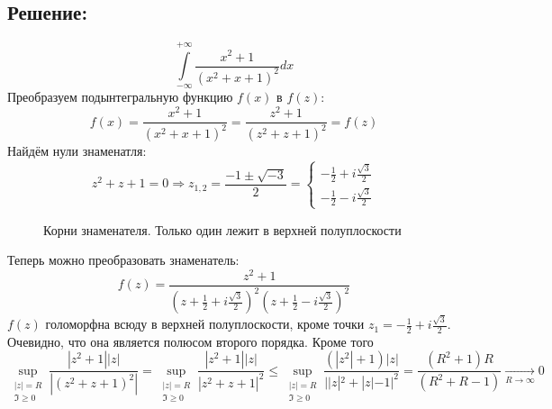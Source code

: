\documentclass{article}
\begin{document}
	\subsection{Решение:}
	\[\int\limits_{-\infty}^{+\infty} \frac{x^2+1}{\left(x^2 + x + 1\right)^2}dx\]
	Преобразуем подынтегральную функцию $f(x)$ в $f(z)$:
	\[f(x) = \frac{x^2+1}{\left(x^2 + x + 1\right)^2}  = \frac{z^2+1}{\left(z^2 + z + 1\right)^2} = f(z)\]
	Найдём нули знаменатля:
	\[z^2 + z + 1 = 0 \Rightarrow z_{1,2} = \frac{-1 \pm \sqrt{-3}}{2} = \begin{cases}
		-\frac{1}{2} + i \frac{\sqrt{3}}{2}\\
		-\frac{1}{2} - i \frac{\sqrt{3}}{2}
	\end{cases}\]
	\begin{figure}[h]
		\centering
		\caption{Корни знаменателя. Только один лежит в верхней полуплоскости}
		
	\end{figure}
	\newline
	Теперь можно преобразовать знаменатель:
	\[f(z) = \frac{z^2 + 1}{\left(z+\frac{1}{2} + i\frac{\sqrt{3}}{2}\right)^2 \left(z+\frac{1}{2} - i\frac{\sqrt{3}}{2}\right)^2}\]
	$f(z)$ голоморфна всюду в верхней полуплоскости, кроме точки $z_1 = -\frac{1}{2} + i \frac{\sqrt{3}}{2}$. Очевидно, что она является полюсом второго порядка.\newline
	Кроме того
	\[\sup\limits_{\substack{|z|= R\\\Im\ge0}} \frac{|z^2+1||z|}{|(z^2+z+1)^2|} = \sup\limits_{\substack{|z|= R\\\Im\ge0}} \frac{|z^2+1||z|}{|z^2+z+1|^2} \le \sup\limits_{\substack{|z|= R\\\Im\ge0}}\frac{(|z^2| + 1)|z|}{||z|^2 + |z| - 1|^2} = \frac{(R^2 + 1)R}{(R^2 +R-1)} \underset{R\rightarrow\infty}{\rightarrow}0\]
\end{document}
